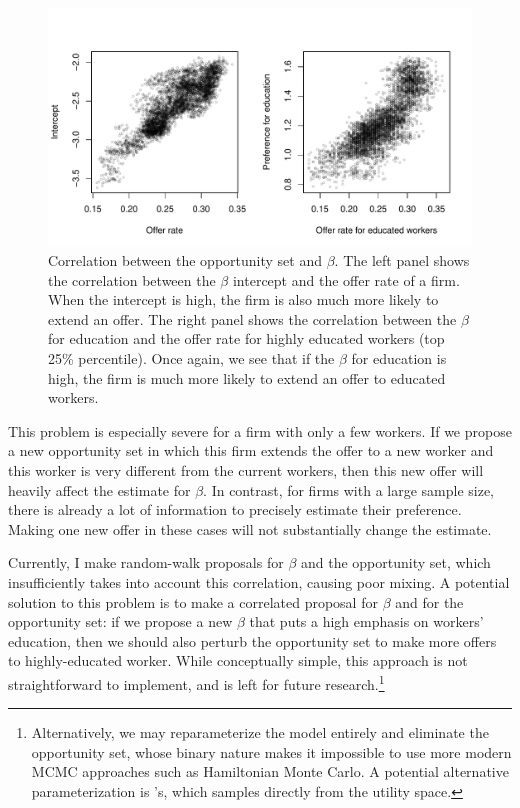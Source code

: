 \begin{figure}[tbp]
  \centering
  \includegraphics[width=\textwidth,keepaspectratio]{../figure/sim_labor_nojobs_opp_beta_correlation_managerial}
  \caption[Correlation between the opportunity set and $\beta$.]{Correlation
    between the opportunity set and $\beta$. The left panel shows the
    correlation between the $\beta$ intercept and the offer rate of a firm. When
  the intercept is high, the firm is also much more likely to extend an offer.
  The right panel shows the correlation between the $\beta$ for education and
  the offer rate for highly educated workers (top 25\% percentile). Once again,
  we see that if the $\beta$ for education is high, the firm is much  more
  likely to extend an offer to educated workers.}
  \label{fig:sim_labor_nojobs_opp_beta_correlation_managerial}
\end{figure}


This problem is especially severe for a firm with only a few workers. If we
propose a new opportunity set in which this firm extends the offer to a new
worker and this worker is very different from the current workers, then this new
offer will heavily affect the estimate for $\beta$. In contrast, for firms with
a large sample size, there is already a lot of information to precisely estimate
their preference. Making one new offer in these cases will not substantially
change the estimate.

Currently, I make random-walk proposals for $\beta$ and the opportunity set,
which insufficiently takes into account this correlation, causing poor mixing. A
potential solution to this problem is to make a correlated proposal for $\beta$
and for the opportunity set: if we propose a new $\beta$ that puts a high
emphasis on workers' education, then we should also perturb the opportunity set
to make more offers to highly-educated worker. While conceptually simple, this
approach is not straightforward to implement, and is left for future
research.\footnote{Alternatively, we may reparameterize the model entirely and
  eliminate the opportunity set, whose binary nature makes it impossible to use
  more modern MCMC approaches such as Hamiltonian Monte Carlo. A potential
  alternative parameterization is \citet{Logan2008}'s, which samples directly
  from the utility space.}

